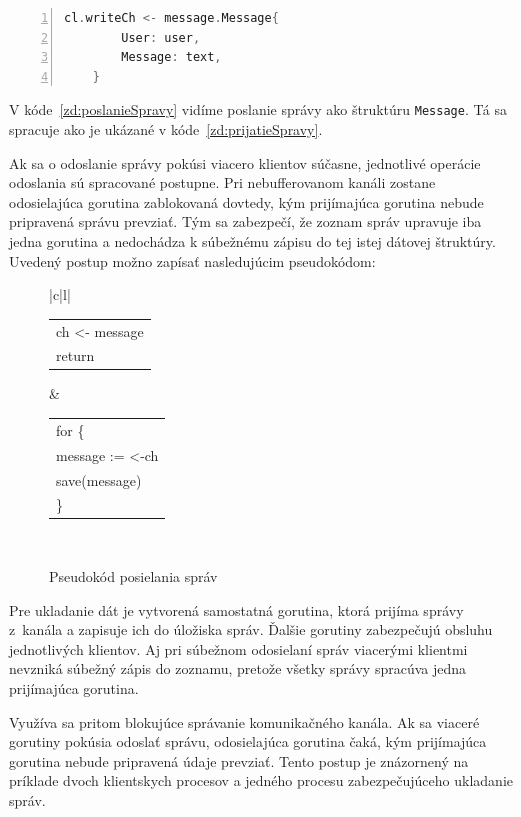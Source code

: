 \documentclass[
  biblatex,
  seconds=true,
  language=slovak,
  figures=false,
  urldate=iso,
  glossaries,
  index
]{kidiplom}
\begin{document}
\begin{lstlisting}[language=Go, numbers=left, caption={Poslanie správy}, captionpos=b, label={zd:poslanieSpravy}]
	cl.writeCh <- message.Message{
		User: user,
		Message: text,
	}
\end{lstlisting}

V kóde~\ref{zd:poslanieSpravy} vidíme poslanie správy ako štruktúru \texttt{Message}. Tá sa spracuje ako je ukázané v kóde~\ref{zd:prijatieSpravy}.

Ak sa o odoslanie správy pokúsi viacero klientov súčasne, jednotlivé operácie odoslania sú spracované postupne. Pri nebufferovanom kanáli zostane odosielajúca gorutina zablokovaná dovtedy, kým prijímajúca gorutina nebude pripravená správu prevziať. Tým sa zabezpečí, že zoznam správ upravuje iba jedna gorutina a nedochádza k súbežnému zápisu do tej istej dátovej štruktúry. Uvedený postup možno zapísať nasledujúcim pseudokódom:

\begin{figure}[h]
	\centering
	\label{pseudokodPosielaniaSprav}
	\begin{tabular}{|c|l|}
		\hline
		 \\
		\hline
		\begin{tabular}{l}
			ch <- message \\
			return
		\end{tabular}
		&
		\begin{tabular}{l}
			for \{ \\
			\quad message := <-ch \\
			\quad save(message) \\
			\}
		\end{tabular} \\
		\hline
	\end{tabular}
	\caption{Pseudokód posielania správ}
\end{figure}

Pre ukladanie dát je vytvorená samostatná gorutina, ktorá prijíma správy z~kanála a zapisuje ich do úložiska správ. Ďalšie gorutiny zabezpečujú obsluhu jednotlivých klientov. Aj pri súbežnom odosielaní správ viacerými klientmi nevzniká súbežný zápis do zoznamu, pretože všetky správy spracúva jedna prijímajúca gorutina.

Využíva sa pritom blokujúce správanie komunikačného kanála. Ak sa viaceré gorutiny pokúsia odoslať správu, odosielajúca gorutina čaká, kým prijímajúca gorutina nebude pripravená údaje prevziať. Tento postup je znázornený na príklade dvoch klientskych procesov a jedného procesu zabezpečujúceho ukladanie správ.
\end{document}
